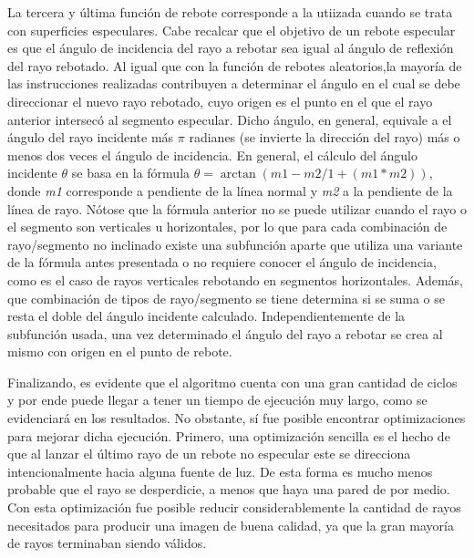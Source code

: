 \documentclass[conference]{IEEEtran}
\begin{document}
La tercera y última función de rebote corresponde a la utiizada cuando se trata con superficies especulares. Cabe recalcar que el objetivo de un rebote especular es que el ángulo de incidencia del rayo a rebotar sea igual al ángulo de reflexión del rayo rebotado. Al igual que con la función de rebotes aleatorios,la mayoría de las instrucciones realizadas contribuyen a determinar el ángulo en el cual se debe direccionar el nuevo rayo rebotado, cuyo origen es el punto en el que el rayo anterior intersecó al segmento especular. Dicho ángulo, en general, equivale a el ángulo del rayo incidente más $\pi$ radianes (se invierte la dirección del rayo) más o menos dos veces el ángulo de incidencia. En general, el cálculo del ángulo incidente $\theta$ se basa en la fórmula \(\theta = \arctan{(m1 - m2 / 1 + (m1 * m2))}\), donde \textit{m1} corresponde a pendiente de la línea normal y \textit{m2} a la pendiente de la línea de rayo. Nótose que la fórmula anterior no se puede utilizar cuando el rayo o el segmento son verticales u horizontales, por lo que para cada combinación de rayo/segmento no inclinado existe una subfunción aparte que utiliza una variante de la fórmula antes presentada o no requiere conocer el ángulo de incidencia, como es el caso de rayos verticales rebotando en segmentos horizontales. Además, que combinación de tipos de rayo/segmento se tiene determina si se suma o se resta el doble del ángulo incidente calculado. Independientemente de la subfunción usada, una vez determinado el ángulo del rayo a rebotar se crea al mismo con origen en el punto de rebote.

Finalizando, es evidente que el algoritmo cuenta con una gran cantidad de ciclos y por ende puede llegar a tener un tiempo de ejecución muy largo, como se evidenciará en los resultados. No obstante, sí fue posible encontrar optimizaciones para mejorar dicha ejecución. Primero, una optimización sencilla es el hecho de que al lanzar el último rayo de un rebote no especular este se direcciona intencionalmente hacia alguna fuente de luz. De esta forma es mucho menos probable que el rayo se desperdicie, a menos que haya una pared de por medio. Con esta optimización fue posible reducir considerablemente la cantidad de rayos necesitados para producir una imagen de buena calidad, ya que la gran mayoría de rayos terminaban siendo válidos. 
\end{document}
